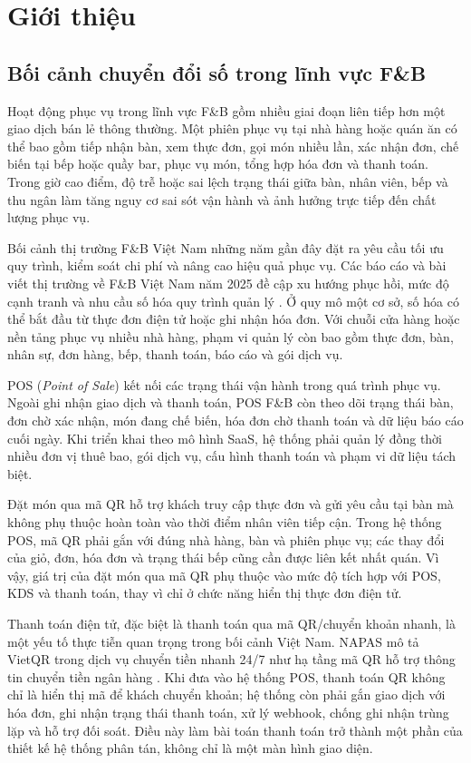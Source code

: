 \chapter{Giới thiệu}

\section{Bối cảnh chuyển đổi số trong lĩnh vực F\&B}

Hoạt động phục vụ trong lĩnh vực F\&B gồm nhiều giai đoạn liên tiếp hơn một giao dịch bán lẻ thông thường. Một phiên phục vụ tại nhà hàng hoặc quán ăn có thể bao gồm tiếp nhận bàn, xem thực đơn, gọi món nhiều lần, xác nhận đơn, chế biến tại bếp hoặc quầy bar, phục vụ món, tổng hợp hóa đơn và thanh toán. Trong giờ cao điểm, độ trễ hoặc sai lệch trạng thái giữa bàn, nhân viên, bếp và thu ngân làm tăng nguy cơ sai sót vận hành và ảnh hưởng trực tiếp đến chất lượng phục vụ.

Bối cảnh thị trường F\&B Việt Nam những năm gần đây đặt ra yêu cầu tối ưu quy trình, kiểm soát chi phí và nâng cao hiệu quả phục vụ. Các báo cáo và bài viết thị trường về F\&B Việt Nam năm 2025 đề cập xu hướng phục hồi, mức độ cạnh tranh và nhu cầu số hóa quy trình quản lý \cite{ipos-nestle-fnb-report-2025,baochinhphu-fnb-growth-2025}. Ở quy mô một cơ sở, số hóa có thể bắt đầu từ thực đơn điện tử hoặc ghi nhận hóa đơn. Với chuỗi cửa hàng hoặc nền tảng phục vụ nhiều nhà hàng, phạm vi quản lý còn bao gồm thực đơn, bàn, nhân sự, đơn hàng, bếp, thanh toán, báo cáo và gói dịch vụ.

POS (\textit{Point of Sale}) kết nối các trạng thái vận hành trong quá trình phục vụ. Ngoài ghi nhận giao dịch và thanh toán, POS F\&B còn theo dõi trạng thái bàn, đơn chờ xác nhận, món đang chế biến, hóa đơn chờ thanh toán và dữ liệu báo cáo cuối ngày. Khi triển khai theo mô hình SaaS, hệ thống phải quản lý đồng thời nhiều đơn vị thuê bao, gói dịch vụ, cấu hình thanh toán và phạm vi dữ liệu tách biệt.

Đặt món qua mã QR hỗ trợ khách truy cập thực đơn và gửi yêu cầu tại bàn mà không phụ thuộc hoàn toàn vào thời điểm nhân viên tiếp cận. Trong hệ thống POS, mã QR phải gắn với đúng nhà hàng, bàn và phiên phục vụ; các thay đổi của giỏ, đơn, hóa đơn và trạng thái bếp cũng cần được liên kết nhất quán. Vì vậy, giá trị của đặt món qua mã QR phụ thuộc vào mức độ tích hợp với POS, KDS và thanh toán, thay vì chỉ ở chức năng hiển thị thực đơn điện tử.

Thanh toán điện tử, đặc biệt là thanh toán qua mã QR/chuyển khoản nhanh, là một yếu tố thực tiễn quan trọng trong bối cảnh Việt Nam. NAPAS mô tả VietQR trong dịch vụ chuyển tiền nhanh 24/7 như hạ tầng mã QR hỗ trợ thông tin chuyển tiền ngân hàng \cite{napas-fastfund-vietqr}. Khi đưa vào hệ thống POS, thanh toán QR không chỉ là hiển thị mã để khách chuyển khoản; hệ thống còn phải gắn giao dịch với hóa đơn, ghi nhận trạng thái thanh toán, xử lý webhook, chống ghi nhận trùng lặp và hỗ trợ đối soát. Điều này làm bài toán thanh toán trở thành một phần của thiết kế hệ thống phân tán, không chỉ là một màn hình giao diện.


